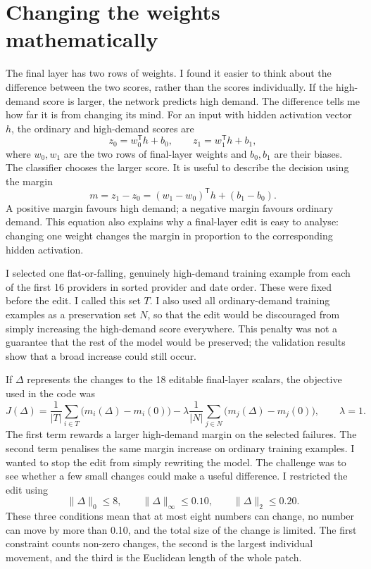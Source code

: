 \documentclass[11pt,a4paper]{article}
\begin{document}
\section*{Changing the weights mathematically}
The final layer has two rows of weights. I found it easier to think about the difference between the two scores, rather than the scores individually. If the high-demand score is larger, the network predicts high demand. The difference tells me how far it is from changing its mind. For an input with hidden activation vector $h$, the ordinary and high-demand scores are
\[
z_0 = w_0^\mathsf{T}h+b_0, \qquad z_1 = w_1^\mathsf{T}h+b_1,
\]
where $w_0,w_1$ are the two rows of final-layer weights and $b_0,b_1$ are their biases. The classifier chooses the larger score. It is useful to describe the decision using the margin
\[
m = z_1-z_0 = (w_1-w_0)^\mathsf{T}h+(b_1-b_0).
\]
A positive margin favours high demand; a negative margin favours ordinary demand. This equation also explains why a final-layer edit is easy to analyse: changing one weight changes the margin in proportion to the corresponding hidden activation.

I selected one flat-or-falling, genuinely high-demand training example from each of the first 16 providers in sorted provider and date order. These were fixed before the edit. I called this set $T$. I also used all ordinary-demand training examples as a preservation set $N$, so that the edit would be discouraged from simply increasing the high-demand score everywhere. This penalty was not a guarantee that the rest of the model would be preserved; the validation results show that a broad increase could still occur.

If $\Delta$ represents the changes to the 18 editable final-layer scalars, the objective used in the code was
\[
J(\Delta) = \frac{1}{|T|}\sum_{i\in T}\bigl(m_i(\Delta)-m_i(0)\bigr)
 - \lambda\frac{1}{|N|}\sum_{j\in N}\bigl(m_j(\Delta)-m_j(0)\bigr),
\qquad \lambda=1.
\]
The first term rewards a larger high-demand margin on the selected failures. The second term penalises the same margin increase on ordinary training examples. I wanted to stop the edit from simply rewriting the model. The challenge was to see whether a few small changes could make a useful difference. I restricted the edit using
\[
\|\Delta\|_0\leq 8, \qquad \|\Delta\|_\infty\leq 0.10, \qquad \|\Delta\|_2\leq 0.20.
\]
These three conditions mean that at most eight numbers can change, no number can move by more than 0.10, and the total size of the change is limited. The first constraint counts non-zero changes, the second is the largest individual movement, and the third is the Euclidean length of the whole patch.
\end{document}
